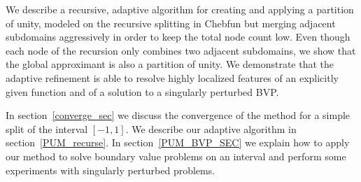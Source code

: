 We describe a recursive, adaptive algorithm for creating and applying a partition of unity, modeled on the recursive splitting in Chebfun but merging adjacent subdomains aggressively in order to keep the total node count low. Even though each node of the recursion only combines two adjacent subdomains, we show that the global approximant is also a partition of unity. We demonstrate that the adaptive refinement is able to resolve highly localized features of an explicitly given function and of a solution to a singularly perturbed BVP. 
 
In section~\ref{converge_sec} we discuss the convergence of the method for a simple split of the interval $[-1,1]$. We describe our adaptive algorithm in section~\ref{PUM_recurse}. In section~\ref{PUM_BVP_SEC} we explain how to apply our method to solve boundary value problems on an interval and perform some experiments with singularly perturbed problems.
 
